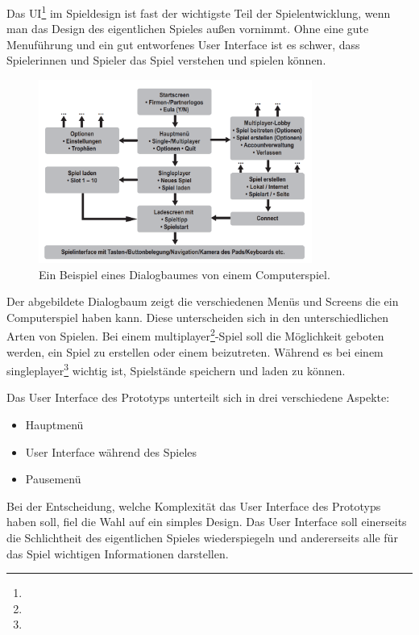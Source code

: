 Das \gls{UI}\footnote[1]{} im Spieldesign ist fast der wichtigste Teil der Spielentwicklung, wenn man das Design des eigentlichen Spieles außen vornimmt. Ohne eine gute Menuführung und ein gut entworfenes User Interface ist es schwer, dass Spielerinnen und Spieler das Spiel verstehen und spielen können. 

\begin{figure}[H]
  \centering
  \includegraphics[width=0.8\textwidth]{chapters/03/images/Spielinterface.png}
  \caption{Ein Beispiel eines Dialogbaumes von einem Computerspiel.}
  \label{htl01}
\end{figure}

Der abgebildete Dialogbaum zeigt die verschiedenen Menüs und Screens die ein Computerspiel haben kann. Diese unterscheiden sich in den unterschiedlichen Arten von Spielen. Bei einem \gls{multiplayer}\footnote[2]{}-Spiel soll die Möglichkeit geboten werden, ein Spiel zu erstellen oder einem beizutreten. Während es bei einem \gls{singleplayer}\footnote[3]{} wichtig ist, Spielstände speichern und laden zu können.

\pagebreak

Das User Interface des Prototyps unterteilt sich in drei verschiedene Aspekte:

\begin{itemize}
    \item Hauptmenü
    \item User Interface während des Spieles
    \item Pausemenü
\end{itemize}

\noindent
Bei der Entscheidung, welche Komplexität das User Interface des Prototyps haben soll, fiel die Wahl auf ein simples Design. 
Das User Interface soll einerseits die Schlichtheit des eigentlichen Spieles wiederspiegeln und andererseits alle für das Spiel wichtigen Informationen darstellen.


